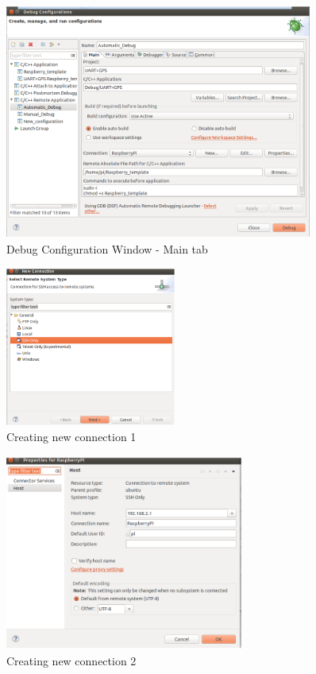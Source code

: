 \begin{figure}[H]
	\centering\includegraphics[width=0.9\textwidth]{fig/Dev_Concept/Debug2}
	\caption{Debug Configuration Window - Main tab}
	\label{fig:Debug2}
\end{figure}

\begin{figure}[H]
	\centering\includegraphics[width=0.5\textwidth]{fig/Dev_Concept/Debug3}
	\caption{Creating new connection 1}
	\label{fig:Debug3}
\end{figure}

\begin{figure}[H]
	\centering\includegraphics[width=0.7\textwidth]{fig/Dev_Concept/Debug4}
	\caption{Creating new connection 2}
	\label{fig:Debug4}
\end{figure}

